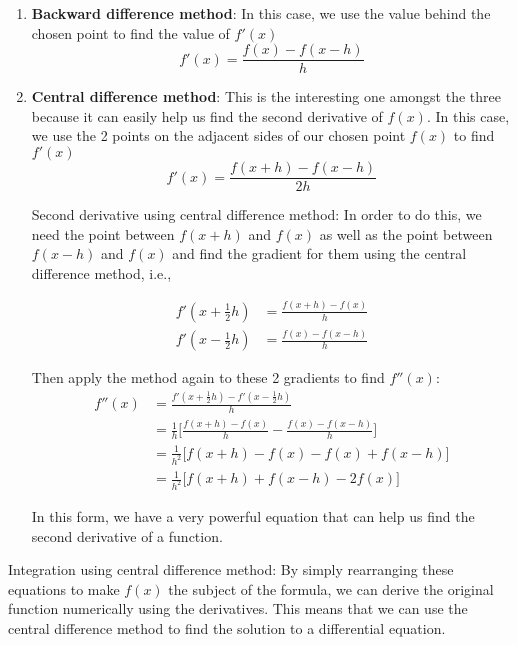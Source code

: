 \begin{enumerate}
\item \textbf{Backward difference method}: In this case, we use the value behind the chosen point to find the value of $f'(x)$
\begin{equation*}
f'(x)=\frac{f(x)-f(x-h)}{h}
\end{equation*}
\item \textbf{Central difference method}: This is the interesting one amongst the three because it can easily help us find the second derivative of $f(x)$. In this case, we use the 2 points on the adjacent sides of our chosen point $f(x)$ to find $f'(x)$
\begin{equation*}
    f'(x)=\frac{f(x+h)-f(x-h)}{2h}
\end{equation*}

Second derivative using central difference method: In order to do this, we need the point between $f(x+h)$ and $f(x)$ as well as the point between $f(x-h)$ and $f(x)$ and find the gradient for them using the central difference method, i.e.,

\begin{align*}
    f'(x+\frac{1}{2}h)&=\frac{f(x+h)-f(x)}{h} \\
    f'(x-\frac{1}{2}h)&=\frac{f(x)-f(x-h)}{h}
\end{align*}

Then apply the method again to these 2 gradients to find $f''(x)$:
\begin{align*}
    f''(x)&=\frac{f'(x+\frac{1}{2}h)-f'(x-\frac{1}{2}h)}{h} \\
    &=\frac{1}{h}\Big[\frac{f(x+h)-f(x)}{h}-\frac{f(x)-f(x-h)}{h}\Big] \\
    &=\frac{1}{h^2}\Big[f(x+h)-f(x)-f(x)+f(x-h)\Big] \\
    &=\frac{1}{h^2}\Big[f(x+h)+f(x-h)-2f(x)\Big]
\end{align*}

In this form, we have a very powerful equation that can help us find the second derivative of a function.
\end{enumerate}

Integration using central difference method: By simply rearranging these equations to make $f(x)$ the subject of the formula, we can derive the original function numerically using the derivatives. This means that we can use the central difference method to find the solution to a differential equation.


